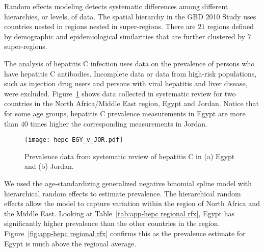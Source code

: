 Random effects modeling detects systematic differences among different
hierarchies, or levels, of data.  The spatial hierarchy in the GBD
2010 Study uses countries nested in regions nested in super-regions.
There are $21$ regions defined by demographic and epidemiological
similarities that are further clustered by $7$ super-regions.

The analysis of hepatitis C infection uses data on the prevalence of persons who
have hepatitis C antibodies.  Incomplete data or data from high-risk
populations, such as injection drug users and persons with viral
hepatitis and liver disease, were excluded.
Figure~\ref{fig:app-hepc data} shows data collected in systematic
review for two countries in the North Africa/Middle East region, Egypt
and Jordan.  Notice that for some age groups, hepatitis C prevalence
measurements in Egypt are more than $40$ times higher the corresponding measurements in
Jordan.

    \begin{figure}[h]
        \begin{center}
            \texttt{[image: hepc-EGY\_v\_JOR.pdf]}
            \caption{Prevalence data from systematic review of
              hepatitis C in (a) Egypt and (b) Jordan.}
            \label{fig:app-hepc data}
        \end{center}
    \end{figure}

We used the age-standardizing generalized negative binomial spline
model with hierarchical random effects to estimate prevalence.  The
hierarchical random effects allow the model to capture variation
within the region of North Africa and the Middle East.  Looking at
Table~\ref{tab:app-hepc regional rfx}, Egypt has significantly
higher prevalence than the other countries in the region.
Figure~\ref{fig:app-hepc regional rfx} confirms this as the prevalence
estimate for Egypt is much above the regional average.

